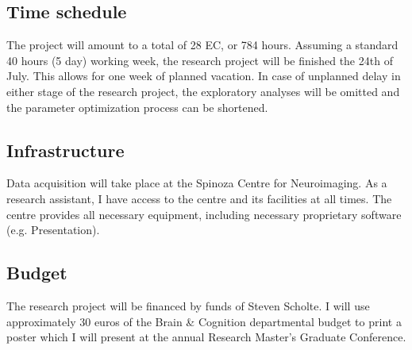 \documentclass[12pt,a4paper]{article}\usepackage[]{graphicx}\usepackage[]{color}
\begin{document}
\subsection{Time schedule}
The project will amount to a total of 28 EC, or  784 hours. Assuming a standard 40 hours (5 day) working week, the research project will be finished the 24th of July. This allows for one week of planned vacation. In case of unplanned delay in either stage of the research project, the exploratory analyses will be omitted and the parameter optimization process can be shortened. 

\subsection{Infrastructure}
Data acquisition will take place at the Spinoza Centre for Neuroimaging. As a research assistant, I have access to the centre and its facilities at all times. The centre provides all necessary equipment, including necessary proprietary software (e.g. Presentation). 

\subsection{Budget}
The research project will be financed by funds of Steven Scholte. I will use approximately 30 euros of the Brain \& Cognition departmental budget to print a poster which I will present at the annual Research Master's Graduate Conference. \\

\noindent
\wordcount

\renewcommand{\bibsection}{} %
\end{document}
